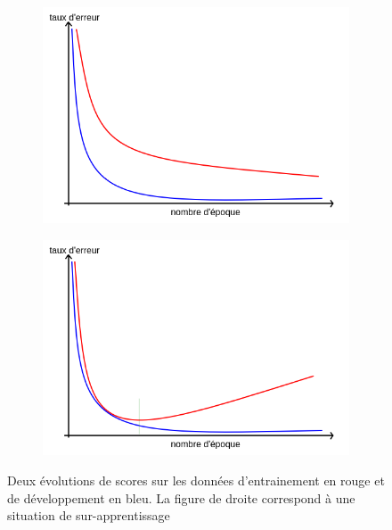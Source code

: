 \begin{figure}[ht]
  \centering
  \begin{subfigure}{.49\textwidth}
    \centering
    \includegraphics[width=.9\linewidth]{./Chapitre2/figures/surapprentissage2.png}
  \end{subfigure}
  \begin{subfigure}{.49\textwidth}
    \centering
    \includegraphics[width=.9\linewidth]{./Chapitre2/figures/surapprentissage1.png}
  \end{subfigure}
  \caption{Deux évolutions de scores sur les données d'entrainement en rouge et de développement en bleu. La figure de droite correspond à une situation de sur-apprentissage}
  \label{fig:surapprentissage}
\end{figure}
